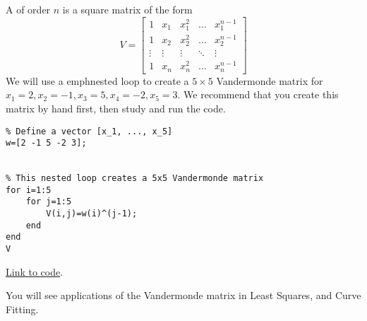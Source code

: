 \documentclass{ximera}
\begin{document}
\begin{example}\label{ex:vandermonde}
    A  of order $n$ is a square matrix of the form 
    $$V=\begin{bmatrix}
1&x_1&x_1^2&\dots&x_1^{n-1}\\
1&x_2&x_2^2&\dots&x_2^{n-1}\\
\vdots&\vdots&\vdots&\ddots&\vdots\\
1&x_n&x_n^2&\dots&x_n^{n-1}\end{bmatrix}$$
We will use a emph{nested} loop to create a $5\times 5$ Vandermonde matrix for $x_1=2, x_2=-1, x_3=5, x_4=-2, x_5=3$.  We recommend that you create this matrix by hand first, then study and run the code.

\begin{verbatim}
% Define a vector [x_1, ..., x_5]
w=[2 -1 5 -2 3];


% This nested loop creates a 5x5 Vandermonde matrix
for i=1:5
    for j=1:5
        V(i,j)=w(i)^(j-1);
    end
end
V
\end{verbatim}

\href{https://sagecell.sagemath.org/?z=eJxFjEEKgzAURPeB3GE2goIKsWRTcdcjFDdiJeiXRjQpMdQcv7Fd9A08GAYmwY1mbQgKbxq9dejCIHKUZZkjDLLn7Gi6CoWARFHh0tecnUlwf-odhnZPE1ZrXxgdKU97vJJBolVmIrfZaGzKOx04m-O_bsRVcobIWZd_PWlTnS9Zc6Q6e6RLIbL6t5GZOPuq_QBP6C9I&lang=octave&interacts=eJyLjgUAARUAuQ==}{Link to code}.

You will see applications of the Vandermonde matrix in Least Squares, and Curve Fitting.

\end{example}


    
\end{document}
